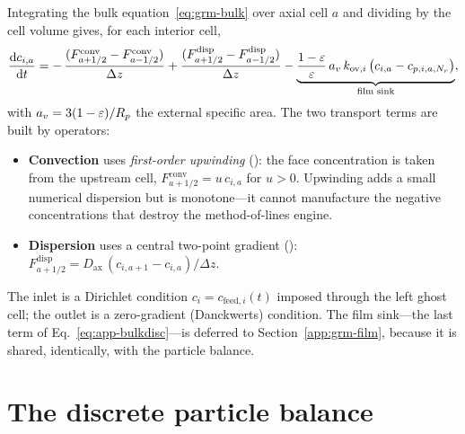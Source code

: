 Integrating the bulk equation~\eqref{eq:grm-bulk} over axial cell $a$ and dividing
by the cell volume gives, for each interior cell,
%
\begin{equation}
\frac{\mathrm{d} c_{i,a}}{\mathrm{d} t}
  = -\,\frac{(F^{\mathrm{conv}}_{a+1/2} - F^{\mathrm{conv}}_{a-1/2})}{\Delta z}
    + \frac{(F^{\mathrm{disp}}_{a+1/2} - F^{\mathrm{disp}}_{a-1/2})}{\Delta z}
    - \underbrace{\frac{1-\varepsilon}{\varepsilon}\,a_v\,k_{\mathrm{ov},i}\,
      \bigl(c_{i,a} - c_{p,i,a,N_r}\bigr)}_{\text{film sink}},
\label{eq:app-bulkdisc}
\end{equation}
%
with $a_v = 3(1-\varepsilon)/R_p$ the external specific area. The two transport terms are
built by  operators:

\begin{itemize}
  \item \textbf{Convection} uses \emph{first-order upwinding}
  (): the face concentration is taken from the
  upstream cell, $F^{\mathrm{conv}}_{a+1/2}=u\,c_{i,a}$ for $u>0$. Upwinding adds a
  small numerical dispersion but is monotone---it cannot manufacture the negative
  concentrations that destroy the method-of-lines engine.
  \item \textbf{Dispersion} uses a central two-point gradient
  (): $F^{\mathrm{disp}}_{a+1/2}=D_{\mathrm{ax}}\,
  (c_{i,a+1}-c_{i,a})/\Delta z$.
\end{itemize}

The inlet is a Dirichlet condition $c_i=c_{\mathrm{feed},i}(t)$ imposed through
the left ghost cell; the outlet is a zero-gradient (Danckwerts) condition. The
film sink---the last term of Eq.~\eqref{eq:app-bulkdisc}---is deferred to
Section~\ref{app:grm-film}, because it is shared, identically, with the particle
balance.

\section{The discrete particle balance}
\label{app:grm-particle}

